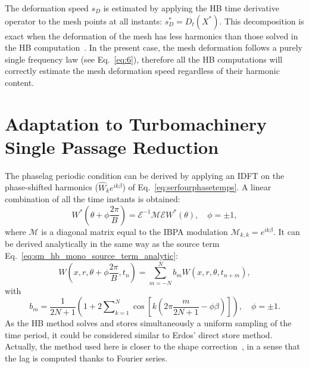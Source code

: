 The deformation speed $s_D$ is estimated by applying the HB time
derivative operator to the mesh points at all instants:
$s_D^*=D_t(X^*)$. This decomposition is exact when the
deformation of the mesh has less harmonics than those solved in the
HB computation~\cite{JDufour2009}. In the present case, the mesh
deformation follows a purely single frequency law (see
Eq.~\eqref{eq:6}), therefore all the HB computations will correctly
estimate the mesh deformation speed regardless of their harmonic content.

\section{Adaptation to Turbomachinery Single Passage Reduction}
\label{sec:Adptatreduction}

The phaselag periodic condition can be derived by applying an
IDFT on the phase-shifted harmonics ($\widehat{W}_ke^{ik\beta}$) of
Eq.~\eqref{eq:serfourphasetemps}. A linear
combination of all the time instants is obtained:
\begin{equation}
  W^*\left(\theta+\phi\frac{2\pi}{B}\right)=\mathcal{E}^{-1}\mathcal{M}\mathcal{E}W^*(\theta),\quad \phi=\pm 1,
\end{equation}
where $\mathcal{M}$ is a diagonal matrix equal to the IBPA modulation
$\mathcal{M}_{k,k}=e^{i k\beta}$. It can be derived
analytically in the same way as the source term 
Eq.~\eqref{eq:sm_hb_mono_source_term_analytic}:
\begin{equation}
  W\left(x, r, \theta+\phi\frac{2\pi}{B}, t_n\right) =\sum_{m=-N}^N
  b_mW(x, r, \theta, t_{n+m}), 
\end{equation}
with
\begin{equation}
  b_m=\frac{1}{2N+1}\left(1+2\sum\nolimits_{k=1}^N\cos\left[k\left(2\pi
        \frac{m}{2N+1}-\phi \beta\right)\right]\right),\quad \phi=\pm 1.
\end{equation}
As the HB method solves and stores simultaneously a uniform sampling
of the time period, it could be considered similar to Erdos' direct
store method. Actually, the method used here is closer to the shape
correction~\cite{He1990}, in a sense that the lag is
computed thanks to Fourier series.
